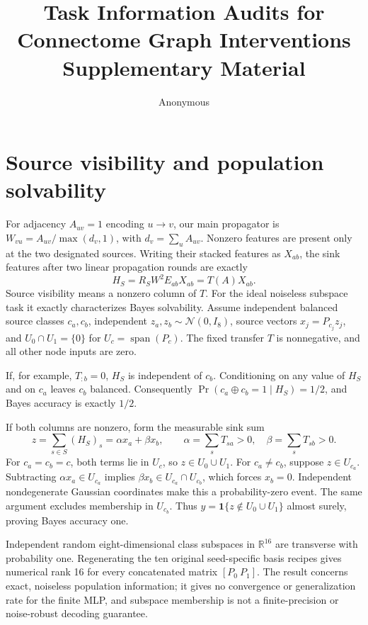 \documentclass[10pt,letterpaper]{article}
\title{Task Information Audits for Connectome Graph Interventions\\\large Supplementary Material}
\author{Anonymous}
\date{}
\begin{document}
\maketitle

\section{Source visibility and population solvability}

For adjacency $A_{uv}=1$ encoding $u\to v$, our main propagator is
$W_{vu}=A_{uv}/\max(d_v,1)$, with $d_v=\sum_u A_{uv}$.
Nonzero features are present only at the two designated sources.
Writing their stacked features as $X_{ab}$, the sink features after two
linear propagation rounds are exactly
\[
 H_S=R_SW^2E_{ab}X_{ab}=T(A)X_{ab}.
\]
Source visibility means a nonzero column of $T$. For the ideal noiseless
subspace task it exactly characterizes Bayes solvability. Assume independent
balanced source classes $c_a,c_b$, independent
$z_a,z_b\sim\mathcal N(0,I_8)$, source vectors $x_j=P_{c_j}z_j$,
and $U_0\cap U_1=\{0\}$ for $U_c=\operatorname{span}(P_c)$.
The fixed transfer $T$ is nonnegative, and all other node inputs are zero.

If, for example, $T_{:b}=0$, $H_S$ is independent of $c_b$.
Conditioning on any value of $H_S$ and on $c_a$ leaves $c_b$ balanced.
Consequently $\Pr(c_a\oplus c_b=1\mid H_S)=1/2$, and Bayes
accuracy is exactly $1/2$.

If both columns are nonzero, form the measurable sink sum
\[
 z=\sum_{s\in S}(H_S)_s=\alpha x_a+\beta x_b,\qquad
 \alpha=\sum_sT_{sa}>0,\quad\beta=\sum_sT_{sb}>0.
\]
For $c_a=c_b=c$, both terms lie in $U_c$, so $z\in U_0\cup U_1$.
For $c_a\ne c_b$, suppose $z\in U_{c_a}$. Subtracting
$\alpha x_a\in U_{c_a}$ implies $\beta x_b\in U_{c_a}\cap U_{c_b}$,
which forces $x_b=0$. Independent nondegenerate Gaussian coordinates
make this a probability-zero event. The same argument excludes membership
in $U_{c_b}$. Thus
$y=\mathbf 1\{z\notin U_0\cup U_1\}$ almost surely, proving Bayes
accuracy one.

Independent random eight-dimensional class subspaces in $\mathbb R^{16}$
are transverse with probability one. Regenerating the ten original
seed-specific basis recipes gives numerical rank 16 for every
concatenated matrix $[P_0\ P_1]$. The result concerns exact, noiseless
population information; it gives no convergence or generalization rate
for the finite MLP, and subspace membership is not a finite-precision or
noise-robust decoding guarantee.
\end{document}
